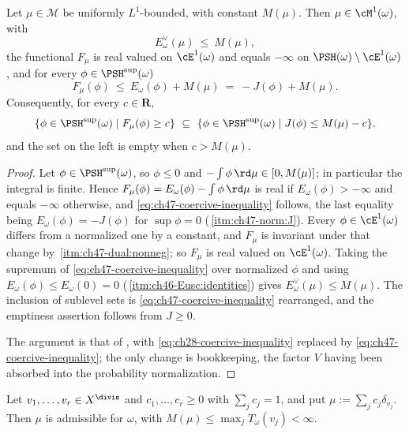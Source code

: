 \begin{lemma}
\label{lem:ch47-coercivity}
Let $\mu\in\mathcal M$ be uniformly $L^1$-bounded, with constant
$M(\mu)$.  Then $\mu\in\cM^1(\omega)$, with
\[
 E^\vee_\omega(\mu)\ \le\ M(\mu),
\]
the functional $F_\mu$ is real valued on $\cE^1(\omega)$ and equals
$-\infty$ on $\PSH(\omega)\setminus\cE^1(\omega)$, and for every
$\phi\in\PSH^{\sup}(\omega)$
\[
 F_\mu(\phi)\ \le\ E_\omega(\phi)+M(\mu)\ =\ -J(\phi)+M(\mu).
\tag{47.26}\label{eq:ch47-coercive-inequality}
\]
Consequently, for every $c\in\mathbf R$,
\[
 \{\phi\in\PSH^{\sup}(\omega)\mid F_\mu(\phi)\ge c\}
 \ \subseteq\ \{\phi\in\PSH^{\sup}(\omega)\mid J(\phi)\le M(\mu)-c\},
\]
and the set on the left is empty when $c>M(\mu)$.
\end{lemma}

\begin{proof}
Let $\phi\in\PSH^{\sup}(\omega)$, so $\phi\le0$ and
$-\int\phi\,\rd\mu\in[0,M(\mu)]$; in particular the integral is finite.
Hence $F_\mu(\phi)=E_\omega(\phi)-\int\phi\,\rd\mu$ is real if
$E_\omega(\phi)>-\infty$ and equals $-\infty$ otherwise, and
\eqref{eq:ch47-coercive-inequality} follows, the last equality being
$E_\omega(\phi)=-J(\phi)$ for $\sup\phi=0$
(\,\cref{itm:ch47-norm:J}).  Every
$\phi\in\cE^1(\omega)$ differs from a normalized one by a constant, and
$F_\mu$ is invariant under that change by
\,\cref{itm:ch47-dual:nonneg}; so $F_\mu$
is real valued on $\cE^1(\omega)$.  Taking the supremum of
\eqref{eq:ch47-coercive-inequality} over normalized $\phi$ and using
$E_\omega(\phi)\le E_\omega(0)=0$
(\,\cref{itm:ch46-Eusc:identities}) gives
$E^\vee_\omega(\mu)\le M(\mu)$.  The inclusion of sublevel sets is
\eqref{eq:ch47-coercive-inequality} rearranged, and the emptiness
assertion follows from $J\ge0$.

The argument is that of , with
\eqref{eq:ch28-coercive-inequality} replaced by
\eqref{eq:ch47-coercive-inequality}; the only change is bookkeeping, the
factor $V$ having been absorbed into the probability normalization.
\end{proof}

\begin{lemma}
\label{lem:ch47-finite-divisorial}
Let $v_1,\dots,v_r\in X^{\divis}$ and $c_1,\dots,c_r\ge0$ with
$\sum_jc_j=1$, and put $\mu:=\sum_jc_j\delta_{v_j}$.  Then $\mu$ is
admissible for $\omega$, with
$M(\mu)\le\max_jT_\omega(v_j)<\infty$.
\end{lemma}

